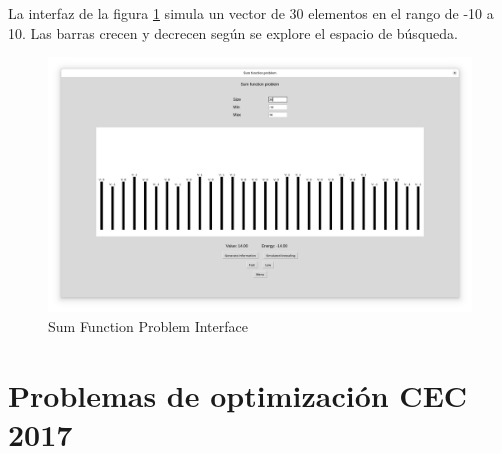 \documentclass[12pt,twoside]{article}
\begin{document}
La interfaz de la figura \ref{fig:sfp} simula un vector de 30 elementos en el rango de -10 a 10. Las barras crecen y decrecen según se explore el espacio de búsqueda. 

\begin{figure}[h!]
	\centering
	\includegraphics[width=\linewidth]{img/sfp}
	\caption{Sum Function Problem Interface}
	\label{fig:sfp}
\end{figure}

\clearpage
\section{Problemas de optimización CEC 2017}
\end{document}
